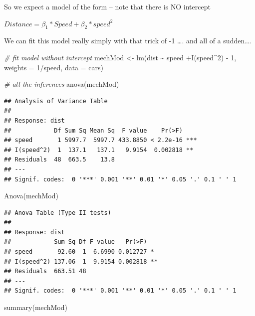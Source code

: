 \documentclass[
]{book}
\newenvironment{Shaded}{\begin{snugshade}}{\end{snugshade}}
\newcommand{\AttributeTok}[1]{\textcolor[rgb]{0.77,0.63,0.00}{#1}}
\newcommand{\CommentTok}[1]{\textcolor[rgb]{0.56,0.35,0.01}{\textit{#1}}}
\newcommand{\DecValTok}[1]{\textcolor[rgb]{0.00,0.00,0.81}{#1}}
\newcommand{\FunctionTok}[1]{\textcolor[rgb]{0.00,0.00,0.00}{#1}}
\newcommand{\NormalTok}[1]{#1}
\newcommand{\OtherTok}[1]{\textcolor[rgb]{0.56,0.35,0.01}{#1}}
\newcommand{\SpecialCharTok}[1]{\textcolor[rgb]{0.00,0.00,0.00}{#1}}
\begin{document}
So we expect a model of the form -- note that there is NO intercept

\(Distance = \beta_{1}*Speed + \beta_{2}*speed^{2}\)

We can fit this model really simply with that trick of -1 \ldots. and all of a sudden\ldots.

\begin{Shaded}
\begin{Highlighting}[]
\CommentTok{\# fit model without intercept}
\NormalTok{mechMod }\OtherTok{\textless{}{-}} \FunctionTok{lm}\NormalTok{(dist }\SpecialCharTok{\textasciitilde{}}\NormalTok{ speed }\SpecialCharTok{+}\FunctionTok{I}\NormalTok{(speed}\SpecialCharTok{\^{}}\DecValTok{2}\NormalTok{) }\SpecialCharTok{{-}} \DecValTok{1}\NormalTok{, }\AttributeTok{weights =} \DecValTok{1}\SpecialCharTok{/}\NormalTok{speed, }\AttributeTok{data =}\NormalTok{ cars)}

\CommentTok{\# all the inferences}
\FunctionTok{anova}\NormalTok{(mechMod)}
\end{Highlighting}
\end{Shaded}

\begin{verbatim}
## Analysis of Variance Table
## 
## Response: dist
##            Df Sum Sq Mean Sq  F value    Pr(>F)    
## speed       1 5997.7  5997.7 433.8850 < 2.2e-16 ***
## I(speed^2)  1  137.1   137.1   9.9154  0.002818 ** 
## Residuals  48  663.5    13.8                       
## ---
## Signif. codes:  0 '***' 0.001 '**' 0.01 '*' 0.05 '.' 0.1 ' ' 1
\end{verbatim}

\begin{Shaded}
\begin{Highlighting}[]
\FunctionTok{Anova}\NormalTok{(mechMod)}
\end{Highlighting}
\end{Shaded}

\begin{verbatim}
## Anova Table (Type II tests)
## 
## Response: dist
##            Sum Sq Df F value   Pr(>F)   
## speed       92.60  1  6.6990 0.012727 * 
## I(speed^2) 137.06  1  9.9154 0.002818 **
## Residuals  663.51 48                    
## ---
## Signif. codes:  0 '***' 0.001 '**' 0.01 '*' 0.05 '.' 0.1 ' ' 1
\end{verbatim}

\begin{Shaded}
\begin{Highlighting}[]
\FunctionTok{summary}\NormalTok{(mechMod)}
\end{Highlighting}
\end{Shaded}
\end{document}
